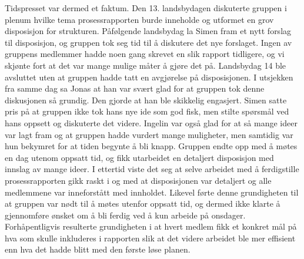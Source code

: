Tidspresset var dermed et faktum.
Den 13. landsbydagen diskuterte gruppen i plenum hvilke tema prosessrapporten burde inneholde og utformet en grov disposisjon for strukturen.
Påfølgende landsbydag la Simen fram et nytt forslag til disposisjon, og gruppen tok seg tid til å diskutere det nye forslaget.
Ingen av gruppens medlemmer hadde noen gang skrevet en slik rapport tidligere, og vi skjønte fort at det var mange mulige måter å gjøre det på.
Landsbydag 14 ble avsluttet uten at gruppen hadde tatt en avgjørelse på disposisjonen.
I utsjekken fra samme dag sa Jonas at han var svært glad for at gruppen tok denne diskusjonen så grundig. Den gjorde at han ble skikkelig engasjert.
Simen satte pris på at gruppen ikke tok hans nye ide som god fisk, men stilte spørsmål ved hans oppsett og diskuterte det videre.
Ingelin var også glad for at så mange ideer var lagt fram og at gruppen hadde vurdert mange muligheter, men samtidig var hun bekymret for at tiden begynte å bli knapp.
Gruppen endte opp med å møtes en dag utenom oppsatt tid, og fikk utarbeidet en detaljert disposisjon med innslag av mange ideer.
I ettertid viste det seg at selve arbeidet med å ferdigstille prosessrapporten gikk raskt i og med at disposisjonen var detaljert og alle medlemmene var inneforstått med innholdet.
Likevel førte denne grundigheten til at gruppen var nødt til å møtes utenfor oppsatt tid, og dermed ikke klarte å gjennomføre ønsket om å bli ferdig ved å kun arbeide på onsdager.
Forhåpentligvis resulterte grundigheten i at hvert medlem fikk et konkret mål på hva som skulle inkluderes i rapporten slik at det videre arbeidet ble mer effisient enn hva det hadde blitt med den første løse planen. 




